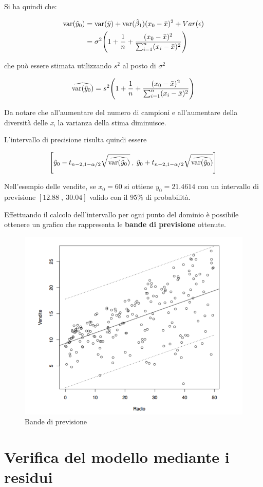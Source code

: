 Si ha quindi che:

\begin{align*}
	\text{var}(\hat{y}_0) &= \text{var}(\bar{y}) + \text{var}(\hat{\beta}_1)(x_0 - \bar{x})^2 + Var(\epsilon) \\
	                         &= \sigma^2 \Bigg( 1 + \frac{1}{n} + \frac{(x_0 - \bar{x})^2}{\sum_{i=1}^{n} (x_i - \bar{x})^2 }\Bigg)
\end{align*}

che può essere stimata utilizzando $ s^2 $ al posto di $ \sigma^2 $

$$
\widehat{\text{var}(\hat{y}_0)} = s^2 \Bigg( 1 + \frac{1}{n} + \frac{(x_0 - \bar{x})^2}{\sum_{i=1}^{n} (x_i - \bar{x})^2} \Bigg)
$$

Da notare che all'aumentare del numero di campioni e all'aumentare della diversità delle \textit{x}, la varianza della stima diminuisce.

L'intervallo di precisione risulta quindi essere

$$
\Bigg[ \hat{y}_0 - t_{n-2, 1-\alpha/2}\sqrt{\widehat{\text{var}(\hat{y}_0)}} \:, \:\hat{y}_0 + t_{n-2, 1-\alpha/2}\sqrt{\widehat{\text{var}(\hat{y}_0)}}\Bigg]
$$

Nell'esempio delle vendite, se $ x_0 = 60 $ si ottiene $ y_0 = 21.4614 $ con un intervallo di previsione $ [12.88 \; , \: 30.04] $ valido con il $ 95\% $ di probabilità.

Effettuando il calcolo dell'intervallo per ogni punto del dominio è possibile ottenere un grafico che rappresenta le \textbf{bande di previsione} ottenute.

\begin{figure}[htbp]
\centering
\includegraphics[width=.5\textwidth]{./notes/immagini/l6-fig10-1.png}
\caption{Bande di previsione}
\end{figure}

\section{Verifica del modello mediante i residui}

